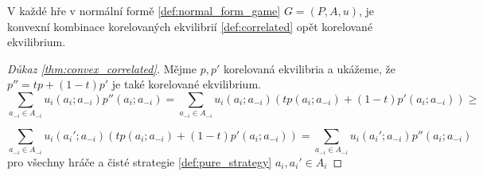 \begin{theorem}
\label{thm:convex_correlated}
V každé hře v normální formě \ref{def:normal_form_game} $G= (P,A,u)$, je konvexní kombinace korelovaných ekvilibrií \ref{def:correlated} opět korelované ekvilibrium. 
\end{theorem}

\begin{proof}[Důkaz \ref{thm:convex_correlated}]
   Mějme $p,p'$ korelovaná ekvilibria a ukážeme, že $p'' = tp + (1-t) p'$ je také korelované ekvilibrium. 
   $$ 
   \sum_{a_{-i} \in A_{-i}} u_i(a_i; a_{-i})p''(a_i; a_{-i}) = \sum_{a_{-i} \in A_{-i}} u_i(a_i; a_{-i})( tp(a_i; a_{-i}) + (1-t)p'(a_i; a_{-i})) \geq 
   $$

   $$ 
   \sum_{a_{-i} \in A_{-i}} u_i(a_i'; a_{-i})( tp(a_i; a_{-i}) + (1-t)p'(a_i; a_{-i})) = \sum_{a_{-i} \in A_{-i}} u_i(a_i'; a_{-i})p''(a_i; a_{-i}) 
   $$
   pro všechny hráče a čisté strategie \ref{def:pure_strategy} $a_i, a_i' \in A_i$
\end{proof}
